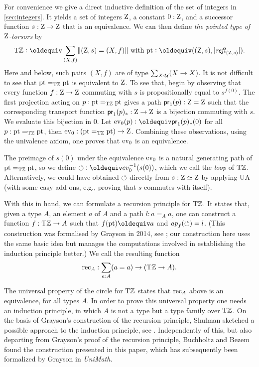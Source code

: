 \documentclass[a4,12pt]{amsart}
\begin{document}
For convenience we give a direct inductive
definition of the set of integers 
in \cref{sec:integers}.  It yields a set
of integers $\mathrm{Z}$, a constant $0:\mathrm{Z}$,
and a successor function $s:\mathrm{Z}\to\mathrm{Z}$
that is an equivalence. We can then define \emph{the 
pointed type of $\mathrm{Z}$-torsors} by
\[
\TorZ\defeq \sum_{(X,f)}\Trunc{(\zet,s)=(X,f)} \text{~with~}
\pt\defeq ((\zet,s),\trunc{\refl{(\zet,s)}}).
\]
Here and below, such pairs $(X,f)$ are of type $\sum_{X:\mathcal{U}}(X\to X)$.
It is not difficult to see 
that ${\mathord{\mathrm{pt}}} =_{\mathrm{T}\mathbb{Z}} {\mathord{\mathrm{pt}}}$ is equivalent to $\mathrm{Z}$.  To see that, 
begin by observing that every function $f:\mathrm{Z}\to\mathrm{Z}$ commuting with $s$
is propositionally equal to $s^{f(0)}$.  The first projection
acting on $p : {\mathord{\mathrm{pt}}} =_{\mathrm{T}\mathbb{Z}} {\mathord{\mathrm{pt}}}$ gives a path $\mathsf{pr}_1(p) : \mathrm{Z}=\mathrm{Z}$
such that the corresponding transport function $\mathsf{pr}_1(p)_* : \mathrm{Z}\to\mathrm{Z}$
is a bijection commuting with $s$. We evaluate this bijection in $0$.
Let $\ev_0(p) \defeq \mathsf{pr}_1(p)_*(0)$ for all $p : {\mathord{\mathrm{pt}}} =_{\mathrm{T}\mathbb{Z}} {\mathord{\mathrm{pt}}}$,
then $\mathrm{ev}_0 : ({\mathord{\mathrm{pt}}} =_{\mathrm{T}\mathbb{Z}} {\mathord{\mathrm{pt}}}) \to \mathrm{Z}$.  Combining these observations,
using the univalence axiom, one proves that $\mathrm{ev}_0$ is an equivalence.

The preimage of $s(0)$ under the equivalence $\mathrm{ev}_0$ is a
natural generating path of ${\mathord{\mathrm{pt}}} =_{\mathrm{T}\mathbb{Z}} {\mathord{\mathrm{pt}}}$, so we define
${\Zloop}\defeq ev_0^{-1}(s(0))$, which we call the \emph{loop}
of ${\mathrm{T}\mathbb{Z}}$. Alternatively, we could have obtained $\circlearrowleft$
directly from $s: \mathrm{Z}\simeq\mathrm{Z}$ by applying UA
(with some easy add-ons, e.g., proving that $s$ commutes with itself).

With this in hand, we can formulate a recursion principle for ${\mathrm{T}\mathbb{Z}}$.
It states that, given a type $A$, an element $a$ of $A$ and a
path $l:a=_A a$, one can construct a function $f:{\mathrm{T}\mathbb{Z}}\to A$
such that $f(\pt)\jdeq a$ and $\mathop{{\it ap}_{f}}(\circlearrowleft)=l$.
(This construction was formalised by Grayson 
in 2014, see \cite{circlerec-Dan}; our construction here uses the 
same basic idea but manages the computations involved in establishing the
induction principle better.)  We call the resulting function
\[
{\mathop{\mathrm{rec}}}_A : \sum_{a:A}(a=a) \to ({\mathrm{T}\mathbb{Z}} \to A).
\]

The universal property of the circle for ${\mathrm{T}\mathbb{Z}}$
states that ${\mathop{\mathrm{rec}}}_A$ above is an equivalence, for all types $A$.
In order to prove this universal property one needs an induction
principle, in which $A$ is not a type but a type family over ${\mathrm{T}\mathbb{Z}}$.
On the basis of Grayson's construction of the recursion principle,
Shulman sketched a possible approach to the induction principle, see \cite{circleind-Mike}. 
Independently of this, but also departing from Grayson's proof of the 
recursion principle, Buchholtz and Bezem found the construction
presented in this paper, which has subsequently been formalized
by Grayson \cite{circleind-Dan,circleind-Dan-theorem} in {\em UniMath}.  
\end{document}
